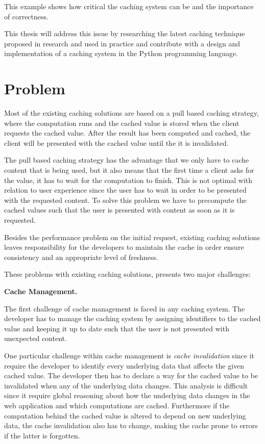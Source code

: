 This example shows how critical the caching system can be and the importance of correctness.

This thesis will address this issue by researching the latest caching technique proposed in research and used in practice and contribute with a design and implementation of a caching system in the Python programming language.

\section{Problem}
\label{sec:problem}

Most of the existing caching solutions are based on a pull based caching strategy, where the computation runs and the cached value is stored when the client requests the cached value. After the result has been computed and cached, the client will be presented with the cached value until the it is invalidated.

The pull based caching strategy has the advantage that we only have to cache content that is being used, but it also means that the first time a client asks for the value, it has to wait for the computation to finish. This is not optimal with relation to user experience since the user has to wait in order to be presented with the requested content. To solve this problem we have to precompute the cached values such that the user is presented with content as soon as it is requested.

Besides the performance problem on the initial request, existing caching solutions leaves responsibility for the developers to maintain the cache in order ensure consistency and an appropriate level of freshness.

These problems with existing caching solutions, presents two major challenges:

\textbf{Cache Management.}

The first challenge of cache management is faced in any caching system. The developer has to manage the caching system by assigning identifiers to the cached value and keeping it up to date such that the user is not presented with unexpected content.

One particular challenge within cache management is \emph{cache invalidation} since it require the developer to identify every underlying data that affects the given cached value. The developer then has to declare a way for the cached value to be invalidated when any of the underlying data changes. This analysis is difficult since it require global reasoning about how the underlying data changes in the web application and which computations are cached. Furthermore if the computation behind the cached value is altered to depend on new underlying data, the cache invalidation also has to change, making the cache prone to errors if the latter is forgotten.

